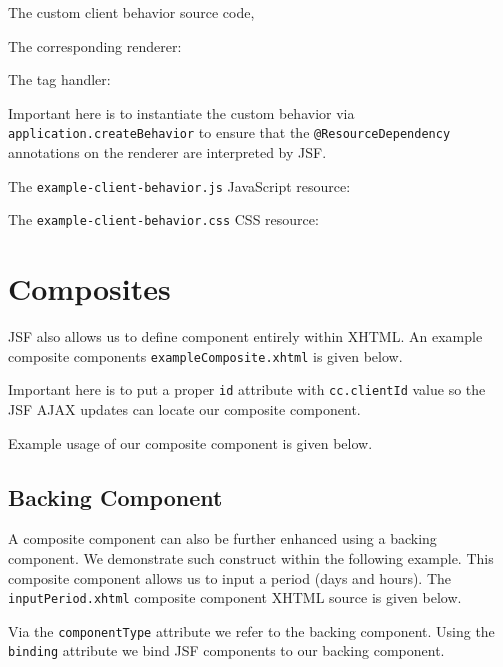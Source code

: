 The custom client behavior source code,


The corresponding renderer:


The tag handler:

Important here is to instantiate the custom behavior via \texttt{application.createBehavior} to ensure that the \texttt{@ResourceDependency} annotations on the renderer are interpreted by JSF.

The \texttt{example-client-behavior.js} JavaScript resource:


The \texttt{example-client-behavior.css} CSS resource:


\section{Composites}
JSF also allows us to define component entirely within XHTML.
An example composite components \texttt{exampleComposite.xhtml} is given below.

Important here is to put a proper \texttt{id} attribute with \texttt{cc.clientId} value so the JSF AJAX updates can locate our composite component.

Example usage of our composite component is given below.


\subsection{Backing Component}
A composite component can also be further enhanced using a backing component.
We demonstrate such construct within the following example.
This composite component allows us to input a period (days and hours).
The \texttt{inputPeriod.xhtml} composite component XHTML source is given below.

Via the \texttt{componentType} attribute we refer to the backing component.
Using the \texttt{binding} attribute we bind JSF components to our backing component.

